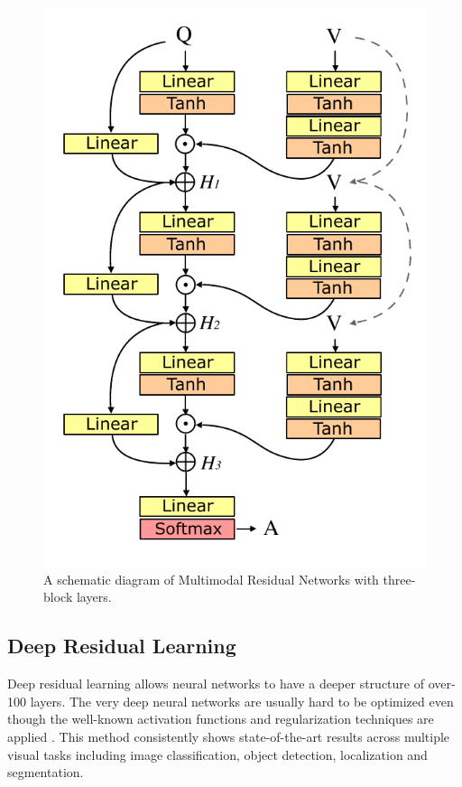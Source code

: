 \documentclass{article}
\begin{document}
\begin{figure}[t]
\begin{minipage}{.36\textwidth}
  \includegraphics[width=\linewidth]{schema_new}
  \caption{A schematic diagram of Multimodal Residual Networks with three-block layers.}
  \label{fig:schema}
\end{minipage}
\end{figure}

\subsection{Deep Residual Learning}

Deep residual learning \cite{He2015} allows neural networks to have a deeper structure of over-100 layers. The very deep neural networks are usually hard to be optimized even though the well-known activation functions and regularization techniques are applied \cite{Nair2010,Hinton2012,Szegedy2015}. This method consistently shows state-of-the-art results across multiple visual tasks including image classification, object detection, localization and segmentation.
\end{document}
